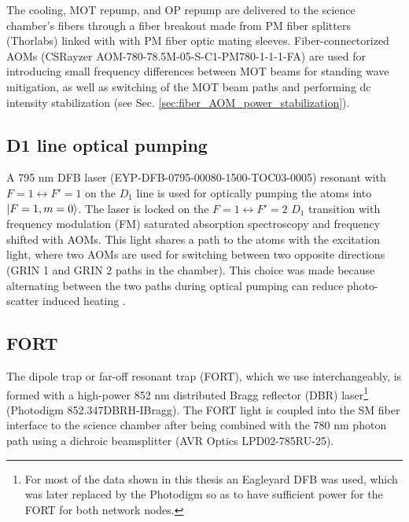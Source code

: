 The cooling, MOT repump, and OP repump are delivered to the science chamber's fibers through a fiber breakout made from PM fiber splitters (Thorlabs) linked with with PM fiber optic mating sleeves. Fiber-connectorized AOMs (CSRayzer AOM-780-78.5M-05-S-C1-PM780-1-1-1-FA) are used for introducing small frequency differences between MOT beams for standing wave mitigation, as well as switching of the MOT beam paths and performing dc intensity stabilization (see Sec. \ref{sec:fiber_AOM_power_stabilization}). 

\subsection{D1 line optical pumping}

A 795 nm DFB laser (EYP-DFB-0795-00080-1500-TOC03-0005) resonant with $F=1 \leftrightarrow F'=1$ on the $D_1$ line is used for optically pumping the atoms into $\ket{F=1, m=0}$. The laser is locked on the $F=1 \leftrightarrow F'=2$ $D_1$ transition with frequency modulation (FM) saturated absorption spectroscopy and frequency shifted with AOMs. This light shares a path to the atoms with the excitation light, where two AOMs are used for switching between two opposite directions (GRIN 1 and GRIN 2 paths in the chamber). This choice was made  because alternating between the two paths during optical pumping can reduce photo-scatter induced heating \cite{su2024fast}.

\subsection{FORT}
The dipole trap or far-off resonant trap (FORT), which we use interchangeably, is formed with a high-power 852 nm distributed Bragg reflector (DBR) laser\footnote{For most of the data shown in this thesis an Eagleyard DFB was used, which was later replaced by the Photodigm so as to have sufficient power for the FORT for both network nodes.} (Photodigm 852.347DBRH-IBragg). The FORT light is coupled into the SM fiber interface to the science chamber after being combined with the 780 nm photon path using a dichroic beamsplitter (AVR Optics LPD02-785RU-25).  

